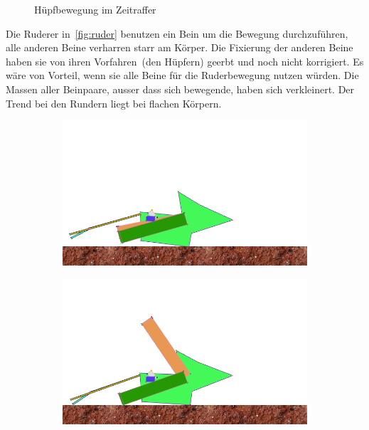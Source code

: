 \begin{figure}[H]
        \caption{Hüpfbewegung im Zeitraffer\label{fig:hupf}}

      \end{figure}

      Die Ruderer in~\vref{fig:ruder} benutzen ein Bein um die Bewegung durchzuführen,
      alle anderen Beine verharren starr am Körper.
      Die Fixierung der anderen Beine haben sie von ihren Vorfahren~(den Hüpfern) geerbt und noch nicht korrigiert.
      Es wäre von Vorteil, wenn sie alle Beine für die Ruderbewegung nutzen würden.
      Die Massen aller Beinpaare, ausser dass sich bewegende, haben sich verkleinert.
      Der Trend bei den Rundern liegt bei flachen Körpern.

      \begin{figure}[H]
        \centering

        \begin{subfigure}[b]{0.3\textwidth}
          \includegraphics[width=\linewidth,center]{graphics/simulation-discussion/ruder_1}
          \caption{\label{fig:ruder_1}}
        \end{subfigure}
        \hspace{\fill}
        \begin{subfigure}[b]{0.3\textwidth}
          \includegraphics[width=\linewidth,center]{graphics/simulation-discussion/ruder_2}

\end{subfigure}
\end{figure}
